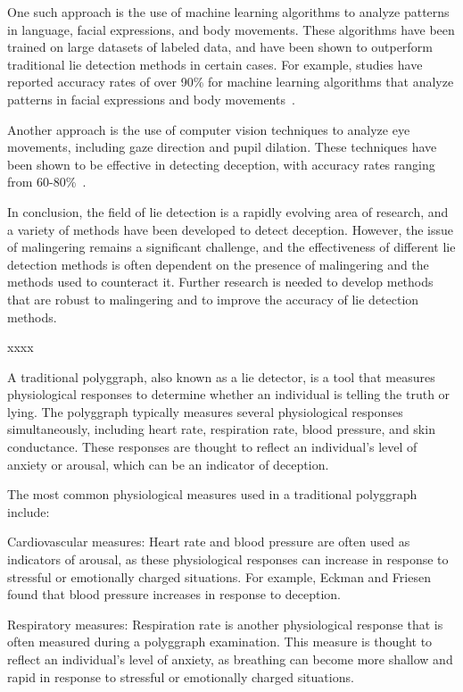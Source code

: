 \documentclass[onecolumn, compsoc,10pt]{IEEEtran}
\begin{document}
One such approach is the use of machine learning algorithms to analyze patterns in language, facial expressions, and body movements. These algorithms have been trained on large datasets of labeled data, and have been shown to outperform traditional lie detection methods in certain cases. For example, studies have reported accuracy rates of over 90\% for machine learning algorithms that analyze patterns in facial expressions and body movements~\cite{Ekman1992,Yu2018}.

Another approach is the use of computer vision techniques to analyze eye movements, including gaze direction and pupil dilation. These techniques have been shown to be effective in detecting deception, with accuracy rates ranging from 60-80\%~\cite{Ducharme2017,Granziero2019}.

In conclusion, the field of lie detection is a rapidly evolving area of research, and a variety of methods have been developed to detect deception. However, the issue of malingering remains a significant challenge, and the effectiveness of different lie detection methods is often dependent on the presence of malingering and the methods used to counteract it. Further research is needed to develop methods that are robust to malingering and to improve the accuracy of lie detection methods.



xxxx


A traditional polyggraph, also known as a lie detector, is a tool that measures physiological responses to determine whether an individual is telling the truth or lying. The polyggraph typically measures several physiological responses simultaneously, including heart rate, respiration rate, blood pressure, and skin conductance. These responses are thought to reflect an individual's level of anxiety or arousal, which can be an indicator of deception.

The most common physiological measures used in a traditional polyggraph include:

Cardiovascular measures: Heart rate and blood pressure are often used as indicators of arousal, as these physiological responses can increase in response to stressful or emotionally charged situations. For example, Eckman and Friesen~\cite{Eckman1969} found that blood pressure increases in response to deception.

Respiratory measures: Respiration rate is another physiological response that is often measured during a polyggraph examination. This measure is thought to reflect an individual's level of anxiety, as breathing can become more shallow and rapid in response to stressful or emotionally charged situations.
\end{document}
